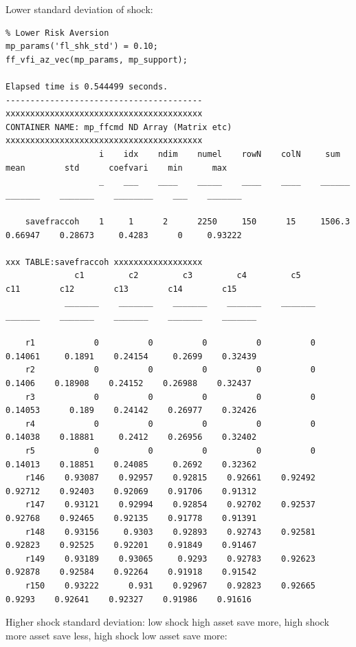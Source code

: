\documentclass[
]{book}
\begin{document}
Lower standard deviation of shock:

\begin{verbatim}
% Lower Risk Aversion
mp_params('fl_shk_std') = 0.10;
ff_vfi_az_vec(mp_params, mp_support);

Elapsed time is 0.544499 seconds.
----------------------------------------
xxxxxxxxxxxxxxxxxxxxxxxxxxxxxxxxxxxxxxxx
CONTAINER NAME: mp_ffcmd ND Array (Matrix etc)
xxxxxxxxxxxxxxxxxxxxxxxxxxxxxxxxxxxxxxxx
                   i    idx    ndim    numel    rowN    colN     sum       mean        std      coefvari    min      max  
                   _    ___    ____    _____    ____    ____    ______    _______    _______    ________    ___    _______

    savefraccoh    1     1      2      2250     150      15     1506.3    0.66947    0.28673     0.4283      0     0.93222

xxx TABLE:savefraccoh xxxxxxxxxxxxxxxxxx
              c1         c2         c3         c4         c5         c11        c12        c13        c14        c15  
            _______    _______    _______    _______    _______    _______    _______    _______    _______    _______

    r1            0          0          0          0          0    0.14061     0.1891    0.24154     0.2699    0.32439
    r2            0          0          0          0          0     0.1406    0.18908    0.24152    0.26988    0.32437
    r3            0          0          0          0          0    0.14053      0.189    0.24142    0.26977    0.32426
    r4            0          0          0          0          0    0.14038    0.18881     0.2412    0.26956    0.32402
    r5            0          0          0          0          0    0.14013    0.18851    0.24085     0.2692    0.32362
    r146    0.93087    0.92957    0.92815    0.92661    0.92492    0.92712    0.92403    0.92069    0.91706    0.91312
    r147    0.93121    0.92994    0.92854    0.92702    0.92537    0.92768    0.92465    0.92135    0.91778    0.91391
    r148    0.93156     0.9303    0.92893    0.92743    0.92581    0.92823    0.92525    0.92201    0.91849    0.91467
    r149    0.93189    0.93065     0.9293    0.92783    0.92623    0.92878    0.92584    0.92264    0.91918    0.91542
    r150    0.93222      0.931    0.92967    0.92823    0.92665     0.9293    0.92641    0.92327    0.91986    0.91616
\end{verbatim}

Higher shock standard deviation: low shock high asset save more, high
shock more asset save less, high shock low asset save more:
\end{document}
